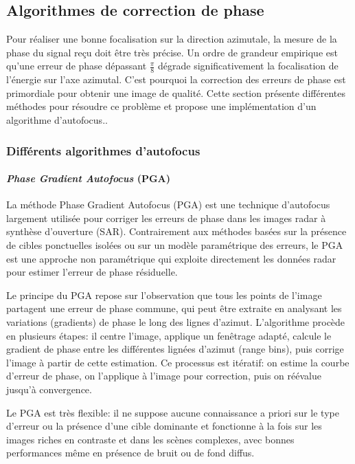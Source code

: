 \subsection{Algorithmes de correction de phase}\label{sebsec:algo_autofocus}
Pour réaliser une bonne focalisation sur la direction azimutale, la mesure de la phase du signal reçu doit être très précise. Un ordre de grandeur empirique est qu'une erreur de phase dépassant $\frac{\pi}{8}$ dégrade significativement la focalisation de l'énergie sur l'axe azimutal. C’est pourquoi la correction des erreurs de phase est primordiale pour obtenir une image de qualité. Cette section présente différentes méthodes pour résoudre ce problème et propose une implémentation d'un algorithme d'autofocus.\cite{autofocus}. 

\subsubsection{Différents algorithmes d'autofocus}
\paragraph{ \textit{Phase Gradient Autofocus} (PGA)}
La méthode Phase Gradient Autofocus (PGA) est une technique d’autofocus largement utilisée pour corriger les erreurs de phase dans les images radar à synthèse d’ouverture (SAR). Contrairement aux méthodes basées sur la présence de cibles ponctuelles isolées ou sur un modèle paramétrique des erreurs, le PGA est une approche non paramétrique qui exploite directement les données radar pour estimer l’erreur de phase résiduelle.

Le principe du PGA repose sur l’observation que tous les points de l’image partagent une erreur de phase commune, qui peut être extraite en analysant les variations (gradients) de phase le long des lignes d’azimut. L’algorithme procède en plusieurs étapes: il centre l’image, applique un fenêtrage adapté, calcule le gradient de phase entre les différentes lignées d’azimut (range bins), puis corrige l’image à partir de cette estimation. Ce processus est itératif: on estime la courbe d’erreur de phase, on l’applique à l’image pour correction, puis on réévalue jusqu’à convergence.

Le PGA est très flexible: il ne suppose aucune connaissance a priori sur le type d’erreur ou la présence d’une cible dominante et fonctionne à la fois sur les images riches en contraste et dans les scènes complexes, avec bonnes performances même en présence de bruit ou de fond diffus.


